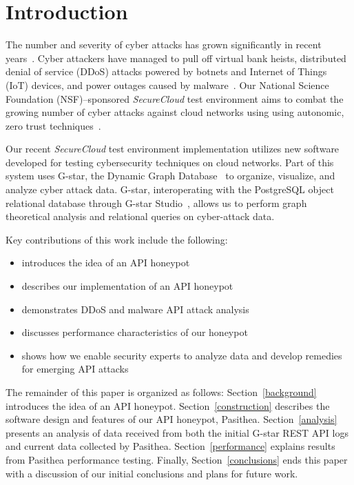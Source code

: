 
\section{Introduction} \label{intro}

The number and severity of cyber attacks has grown significantly in recent years~\cite{Symantec-Threat-Report,IBM-XForce-Report}. 
Cyber attackers have managed to pull off virtual bank heists, distributed denial of service (DDoS) attacks powered by botnets and Internet of Things (IoT) devices, and power outages caused by malware~\cite{IBM-XForce-Report}. 
Our National Science Foundation (NSF)--sponsored {\em SecureCloud} test environment aims to combat the growing number of cyber attacks against cloud networks using using autonomic, zero trust techniques~\cite{7796146}.  

Our recent {\em SecureCloud} test environment implementation utilizes new software developed for testing cybersecurity techniques on cloud networks.
Part of this system uses G-star, the Dynamic Graph Database~\cite{Labouseur-DAPD-2015} to organize, visualize, and analyze cyber attack data. 
G-star, interoperating with the PostgreSQL object relational database through G-star Studio~\cite{inroads-Labouseur16}, allows us to perform graph theoretical analysis and relational queries on cyber-attack data.  

Key contributions of this work include the following:
\begin{itemize}
      \setlength{\itemsep}{1pt}
      \setlength{\parskip}{0pt}
      \setlength{\parsep}{0pt}
   \item introduces the idea of an API honeypot
   \item describes our implementation of an API honeypot
   \item demonstrates DDoS and malware API attack analysis
   \item discusses performance characteristics of our honeypot
   \item shows how we enable security experts to analyze data and develop remedies for emerging API attacks  
\end{itemize}

The remainder of this paper is organized as follows: 
Section~\ref{background} introduces the idea of an API honeypot. 
Section~\ref{construction} describes the software design and features of our API honeypot, Pasithea. 
Section~\ref{analysis} presents an analysis of data received from both the initial G-star REST API logs and current data collected by Pasithea. 
Section~\ref{performance} explains results from Pasithea performance testing.
Finally, Section~\ref{conclusions} ends this paper with a discussion of our initial conclusions and plans for future work.
